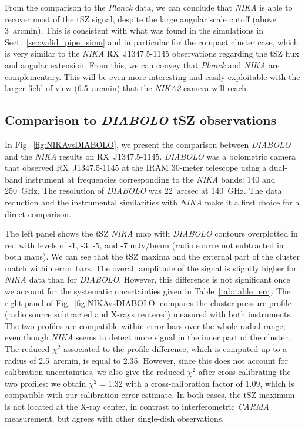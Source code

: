From the comparison to the {\it Planck} data, we can conclude that {\it NIKA} is able to recover most of the tSZ signal, despite the large angular scale cutoff (above 3~arcmin). This is consistent with what was found in the simulations in Sect.~\ref{sec:valid_pipe_simu} and in particular for the compact cluster case, which is very similar to the {\it NIKA} \mbox{RX~J1347.5-1145} observations regarding the tSZ flux and angular extension. From this, we can convey that {\it Planck} and {\it NIKA} are complementary. This will be even more interesting and easily exploitable with the larger field of view (6.5~arcmin) that the {\it NIKA2} camera will reach.

\subsection{Comparison to {\it DIABOLO} tSZ observations}
\label{sec:comp_sz}
In Fig.~\ref{fig:NIKAvsDIABOLO}, we present the comparison between {\it DIABOLO} and the {\it NIKA} results on \mbox{RX~J1347.5-1145}. {\it DIABOLO} \citep{pointecouteau_1999, pointecouteau_2001} was a bolometric camera that observed \mbox{RX~J1347.5-1145} at the IRAM 30-meter telescope using a dual-band instrument at frequencies corresponding to the {\it NIKA} bands: 140 and 250~GHz. The resolution of {\it DIABOLO} was 22~arcsec at 140~GHz. The data reduction and the instrumental similarities with {\it NIKA} make it a first choice for a direct comparison.

The left panel shows the tSZ {\it NIKA} map with {\it DIABOLO} contours overplotted in red with levels of -1, -3, -5, and -7 mJy/beam (radio source not subtracted in both maps).  We can see that the tSZ maxima and the external part of the cluster match within error bars. The overall amplitude of the signal is slightly higher for {\it NIKA} data than for {\it DIABOLO}. However, this difference is not significant once we account for the  systematic uncertainties given in Table~\ref{tab:table_err}. The right panel of Fig.~\ref{fig:NIKAvsDIABOLO} compares the cluster pressure profile (radio source subtracted and X-rays centered) measured with both instruments. The two profiles are compatible within error bars over the whole radial range, even though {\it NIKA} seems to detect more signal in the inner part of the cluster. The reduced $\chi^2$ associated to the profile difference, which is computed up to a radius of 2.5~arcmin, is equal to 2.35. However, since this does not account for calibration uncertainties, we also give the reduced $\chi^2$ after cross calibrating the two profiles: we obtain $\chi^2 = 1.32$ with a cross-calibration factor of 1.09, which is compatible with our calibration error estimate. In both cases, the tSZ maximum is not located at the \mbox{X-ray} center, in contrast to interferometric {\it CARMA} measurement, but agrees with other single-dish observations.


